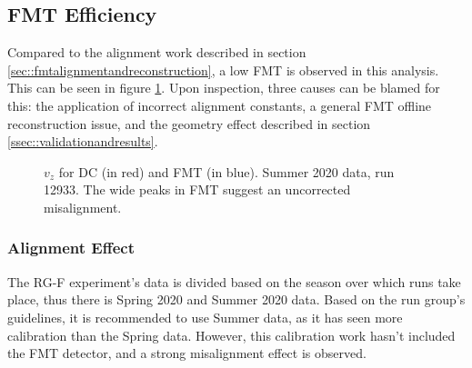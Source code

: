 \subsection{FMT Efficiency}

    Compared to the alignment work described in section \ref{sec::fmtalignmentandreconstruction}, a low FMT is observed in this analysis.
    This can be seen in figure \ref{fig::vz_012933}.
    Upon inspection, three causes can be blamed for this: the application of incorrect alignment constants, a general FMT offline reconstruction issue, and the geometry effect described in section \ref{ssec::validationandresults}.

    \begin{figure}[b!]
        \centering{}
        \caption[$v_z$ for DC and FMT, run 12933]{$v_z$ for DC (in red) and FMT (in blue). Summer 2020 data, run 12933. The wide peaks in FMT suggest an uncorrected misalignment.}
        \label{fig::vz_012933}
    \end{figure}

    \subsubsection{Alignment Effect}
        The RG-F experiment's data is divided based on the season over which runs take place, thus there is Spring 2020 and Summer 2020 data.
        Based on the run group's guidelines, it is recommended to use Summer data, as it has seen more calibration than the Spring data.
        However, this calibration work hasn't included the FMT detector, and a strong misalignment effect is observed.

